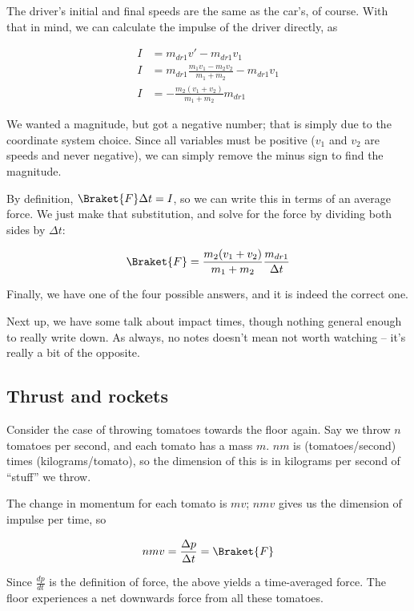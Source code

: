 The driver's initial and final speeds are the same as the car's, of course. With that in mind, we can calculate the impulse of the driver directly, as

\begin{align}
I &= m_{dr1} v' - m_{dr1} v_1\\
I &= m_{dr1}  \frac{m_1 v_1 - m_2 v_2}{m_1 + m_2} - m_{dr1} v_1\\
I &= - \frac{m_2(v_1 + v_2)}{m_1 + m_2} m_{dr1}
\end{align}

We wanted a magnitude, but got a negative number; that is simply due to the coordinate system choice. Since all variables must be positive ($v_1$ and $v_2$ are speeds and never negative), we can simply remove the minus sign to find the magnitude.

By definition, $\Braket{F} \Delta t = I$, so we can write this in terms of an average force. We just make that substitution, and solve for the force by dividing both sides by $\Delta t$:

\begin{equation}
\Braket{F} = \frac{m_2(v_1 + v_2)}{m_1 + m_2} \frac{m_{dr1}}{\Delta t}
\end{equation}

Finally, we have one of the four possible answers, and it is indeed the correct one.

Next up, we have some talk about impact times, though nothing general enough to really write down. As always, no notes doesn't mean not worth watching -- it's really a bit of the opposite.

\subsection{Thrust and rockets}

Consider the case of throwing tomatoes towards the floor again. Say we throw $n$ tomatoes per second, and each tomato has a mass $m$. $n m$ is (tomatoes/second) times (kilograms/tomato), so the dimension of this is in kilograms per second of ``stuff'' we throw.

The change in momentum for each tomato is $m v$; $n m v$ gives us the dimension of impulse per time, so

\begin{equation}
n m v = \frac{\Delta p}{\Delta t} = \Braket{F}
\end{equation}

Since $\displaystyle \frac{dp}{dt}$ is the definition of force, the above yields a time-averaged force. The floor experiences a net downwards force from all these tomatoes.

